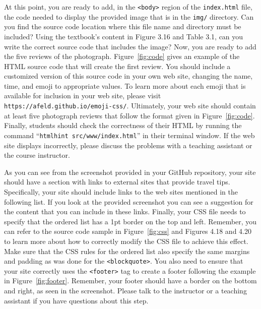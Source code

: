 \documentclass[11pt]{article}
\newcommand{\mainprogram}{\lstinline{index.html}}
\newcommand{\command}[1]{``\lstinline{#1}''}
\newcommand{\program}[1]{\lstinline{#1}}
\newcommand{\url}[1]{\lstinline{#1}}
\begin{document}
At this point, you are ready to add, in the \program{<body>} region of the
\mainprogram{} file, the code needed to display the provided image that is in
the \program{img/} directory. Can you find the source code location where this
file name and directory must be included? Using the textbook's content in Figure
3.16 and Table 3.1, can you write the correct source code that includes the
image? Now, you are ready to add the five reviews of the photograph.
Figure~\ref{fig:code} gives an example of the HTML source code that will create
the first review. You should include a customized version of this source code in
your own web site, changing the name, time, and emoji to appropriate values. To
learn more about each emoji that is available for inclusion in your web site,
please visit \url{https://afeld.github.io/emoji-css/}. Ultimately, your web site
should contain at least five photograph reviews that follow the format given in
Figure~\ref{fig:code}. Finally, students should check the correctness of their
HTML by running the command \command{htmlhint src/www/index.html} in their
terminal window. If the web site displays incorrectly, please discuss the
problems with a teaching assistant or the course instructor.

As you can see from the screenshot provided in your GitHub repository, your site
should have a section with links to external sites that provide travel tips.
Specifically, your site should include links to the web sites mentioned in the
following list. If you look at the provided screenshot you can see a suggestion
for the content that you can include in these links. Finally, your CSS file
needs to specify that the ordered list has a 1pt border on the top and left.
Remember, you can refer to the source code sample in Figure~\ref{fig:css} and
Figures 4.18 and 4.20 to learn more about how to correctly modify the CSS file
to achieve this effect. Make sure that the CSS rules for the ordered list also
specify the same margins and padding as was done for the \program{<blockquote>}.
You also need to ensure that your site correctly uses the \program{<footer>} tag
to create a footer following the example in Figure~\ref{fig:footer}. Remember,
your footer should have a border on the bottom and right, as seen in the
screenshot. Please talk to the instructor or a teaching assistant if you have
questions about this step.

\end{document}
